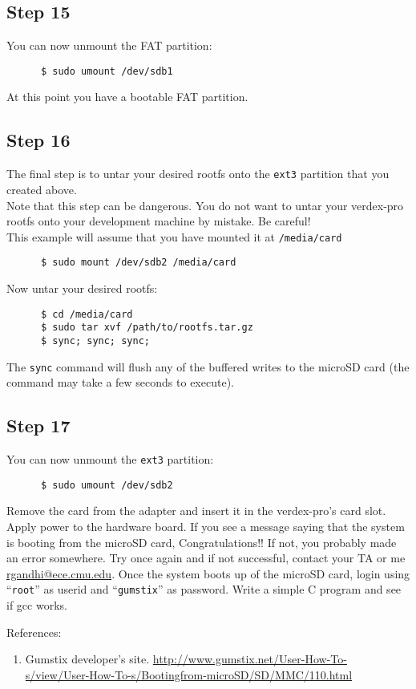\documentclass{article}
\begin{document}
   \subsection{Step 15}
      You can now unmount the FAT partition: 
      \begin{verbatim}
      $ sudo umount /dev/sdb1 
      \end{verbatim}
      At this point you have a bootable FAT partition. 
   \subsection{Step 16}
      The final step is to untar your desired rootfs onto the \texttt{ext3}
      partition that you created above. \\

      Note that this step can be dangerous.  You do not want to untar your
      verdex-pro rootfs onto your development machine  by mistake. Be
      careful! \\

      This example will assume that you have mounted it at \texttt{/media/card}
      \begin{verbatim}
      $ sudo mount /dev/sdb2 /media/card 
      \end{verbatim}
      Now untar your desired rootfs: 
      \begin{verbatim}
      $ cd /media/card 
      $ sudo tar xvf /path/to/rootfs.tar.gz  
      $ sync; sync; sync; 
      \end{verbatim}

      The \texttt{sync} command will flush any of the buffered writes to the
      microSD card (the command may take a few seconds to execute).
   \subsection{Step 17}
      You can now unmount the \texttt{ext3} partition: 
      \begin{verbatim}
      $ sudo umount /dev/sdb2 
      \end{verbatim}

      Remove the card from the adapter and insert it in the verdex-pro’s card
      slot. Apply power to the hardware board. If you see a message saying
      that the system is booting from the microSD card, Congratulations!! If
      not, you probably made an error somewhere. Try once again and if not
      successful, contact your TA or me \url{rgandhi@ece.cmu.edu}. Once the system
      boots up of the microSD card, login using “\texttt{root}” as userid and 
      “\texttt{gumstix}” as password. Write a simple C program and see if gcc
      works.  

      References: 
      \begin{enumerate}
      \item Gumstix developer’s site.
            \url{http://www.gumstix.net/User-How-To-s/view/User-How-To-s/Bootingfrom-microSD/SD/MMC/110.html}
      \end{enumerate}
\end{document}
